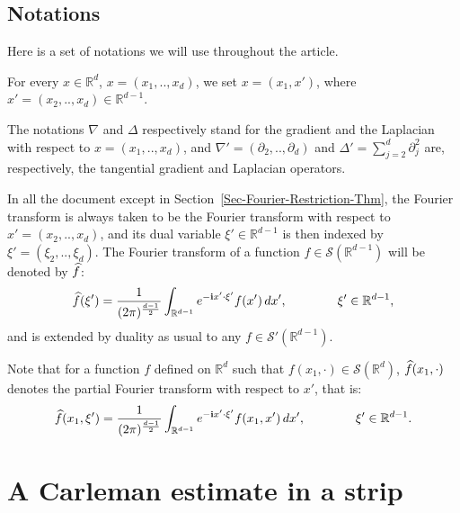 \documentclass[10pt]{amsart}
\theoremstyle{definition}\newtheorem{defi}[theo]{Definition}\newtheorem{rema}[theo]{Remark}\newtheorem{exam}[theo]{Example}\newtheorem{exem}[theo]{Example}\newtheorem{nota}[theo]{Notation}
\newcommand{\scS}{\mathscr{S}}
\newcommand*\R{\mathbb{R}}
\renewcommand{\i}{\mathbf{i}}
\renewcommand{\hat}{\widehat}
\let\oldhat\hat
\renewcommand*{\hat}[1]{\mathchoice{\widehat{#1}}{\widehat{#1}}{\oldhat{#1}}{\oldhat{#1}}}
\begin{document}

\subsection*{Notations}

Here is a set of notations we will use throughout the article.

For every $x\in \R^{d}$, $x=(x_1,..,x_d)$, we set $x=(x_1,x')$, where $x'=(x_2,..,x_d) \in \R^{d-1}$.

The notations $\nabla$ and $\Delta$ respectively stand for the gradient and the Laplacian with respect to $x=(x_1,..,x_d)$, and $\nabla'=(\partial_{2},..,\partial_{{d}})$ and $\Delta'= \sum_{j=2}^{d} \partial_{j}^2$ are, respectively, the tangential gradient and Laplacian operators.

In all the document except in Section~\ref{Sec-Fourier-Restriction-Thm}, the Fourier transform is always taken to be the Fourier transform with respect to $x'=(x_2,..,x_d)$, and its dual variable $\xi' \in \R^{d-1}$ is then indexed by $\xi'=(\xi_2,..,\xi_d)$. The Fourier transform of a function $f \in \scS(\R^{d-1})$ will be denoted by $\hat f$:
\[
\hat f(\xi') = \frac{1}{(2\pi)^{\frac{d-1}{2}}} \int_{\R^{d-1}} e^{-\i x' \cdot \xi'} f(x') \, dx', \qquad \qquad\xi' \in \R^{d-1},
\]
and is extended by duality as usual to any $f \in \scS'(\R^{d-1})$.

Note that for a function $f$ defined on $\R^d$ such that $f(x_1,\cdot) \in \scS(\R^{d})$, $\hat f(x_1, \cdot)$ denotes the partial Fourier transform with respect to $x'$, that is:
\begin{equation}\label{Partial-Fourier-Transform}
\hat f(x_1,\xi') = \frac{1}{(2\pi)^{\frac{d-1}{2}}} \int_{\R^{d-1}} e^{-\i x' \cdot \xi'} f(x_1,x') \, dx', \qquad \qquad\xi' \in \R^{d-1}.
\end{equation}



\section{A Carleman estimate in a strip}\label{Sec-Carleman-Strip}
\end{document}
